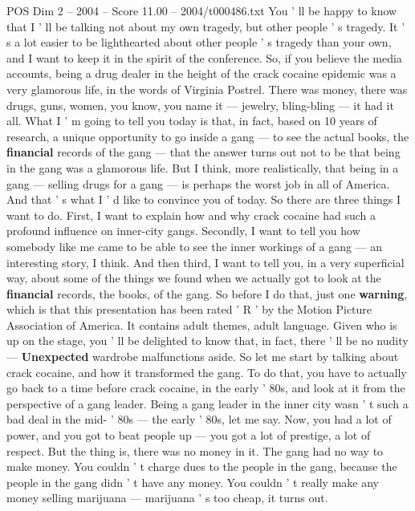 \begin{textsample}{POS Dim 2 – 2004 – Score 11.00 – 2004/t000486.txt}  \label{ex:f2_pos_025}
You ' ll be happy to know that I ' ll be talking not about my own tragedy, but other people ' s tragedy.
It ' s a lot easier to be lighthearted about other people ' s tragedy than your own, and I want to keep it in the spirit of the conference.
So, if you believe the media accounts, being a drug dealer in the height of the crack cocaine epidemic was a very glamorous life, in the words of Virginia Postrel.
There was money, there was drugs, guns, women, you know, you name it — jewelry, bling-bling — it had it all.
What I ' m going to tell you today is that, in fact, based on 10 years of research, a unique opportunity to go inside a gang — to see the actual books, the \textbf{financial} records of the gang — that the answer turns out not to be that being in the gang was a glamorous life.
But I think, more realistically, that being in a gang — selling drugs for a gang — is perhaps the worst job in all of America.
And that ' s what I ' d like to convince you of today.
So there are three things I want to do.
First, I want to explain how and why crack cocaine had such a profound influence on inner-city gangs.
Secondly, I want to tell you how somebody like me came to be able to see the inner workings of a gang — an interesting story, I think.
And then third, I want to tell you, in a very superficial way, about some of the things we found when we actually got to look at the \textbf{financial} records, the books, of the gang.
So before I do that, just one \textbf{warning}, which is that this presentation has been rated ' R ' by the Motion Picture Association of America.
It contains adult themes, adult language.
Given who is up on the stage, you ' ll be delighted to know that, in fact, there ' ll be no nudity — \textbf{Unexpected} wardrobe malfunctions aside.
So let me start by talking about crack cocaine, and how it transformed the gang.
To do that, you have to actually go back to a time before crack cocaine, in the early ' 80s, and look at it from the perspective of a gang leader.
Being a gang leader in the inner city wasn ' t such a bad deal in the mid- ' 80s — the early ' 80s, let me say.
Now, you had a lot of power, and you got to beat people up — you got a lot of prestige, a lot of respect.
But the thing is, there was no money in it.
The gang had no way to make money.
You couldn ' t charge dues to the people in the gang, because the people in the gang didn ' t have any money.
You couldn ' t really make any money selling marijuana — marijuana ' s too cheap, it turns out.

\end{textsample}
